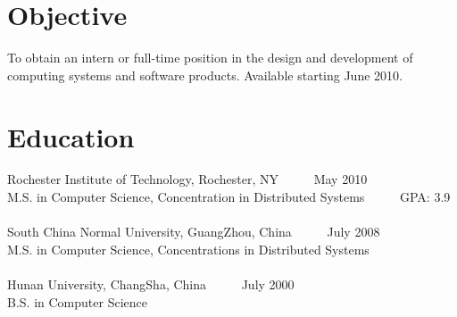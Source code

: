 \documentclass[margin]{res}
\begin{document}
 
 
 
\address{{\bf Current Address} \\ 118 East Squire Drive \#8 \\ Rochester, NY 14623 \\ }

\address{{\bf Permanent Address} \\ 1405 Hornell LN\\Smyrna, GA 30082}
 
\begin{resume} 
 
\section{Objective} 
To obtain an intern or full-time position in the design and development of computing systems and software products. Available starting June 2010.

\section{Education} 
Rochester Institute of Technology, Rochester, NY ~~~~~May 2010\\
M.S. in Computer Science, Concentration in Distributed Systems ~~~~~GPA: 3.9 \\
\\
South China Normal University, GuangZhou, China ~~~~~July 2008\\
M.S. in Computer Science, Concentrations in Distributed Systems \\
\\
Hunan University, ChangSha, China  ~~~~~July 2000\\
B.S. in Computer Science


\end{resume}
\end{document}
